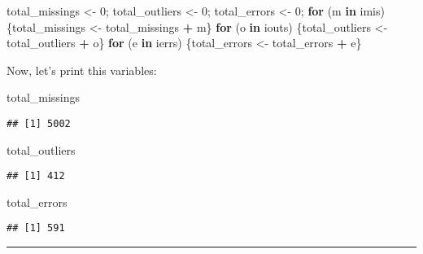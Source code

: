 \documentclass[
  18pt,
  a4paper]{article}
\newenvironment{Shaded}{\begin{snugshade}}{\end{snugshade}}
\newcommand{\ControlFlowTok}[1]{\textcolor[rgb]{0.13,0.29,0.53}{\textbf{#1}}}
\newcommand{\DecValTok}[1]{\textcolor[rgb]{0.00,0.00,0.81}{#1}}
\newcommand{\NormalTok}[1]{#1}
\newcommand{\OperatorTok}[1]{\textcolor[rgb]{0.81,0.36,0.00}{\textbf{#1}}}
\newcommand{\StringTok}[1]{\textcolor[rgb]{0.31,0.60,0.02}{#1}}
\begin{document}
\begin{Shaded}
\begin{Highlighting}[]
\NormalTok{total_missings <-}\StringTok{ }\DecValTok{0}\NormalTok{; total_outliers <-}\StringTok{ }\DecValTok{0}\NormalTok{; total_errors <-}\StringTok{ }\DecValTok{0}\NormalTok{;}
\ControlFlowTok{for}\NormalTok{ (m }\ControlFlowTok{in}\NormalTok{ imis) \{total_missings <-}\StringTok{ }\NormalTok{total_missings }\OperatorTok{+}\StringTok{ }\NormalTok{m\} }
\ControlFlowTok{for}\NormalTok{ (o }\ControlFlowTok{in}\NormalTok{ iouts) \{total_outliers <-}\StringTok{ }\NormalTok{total_outliers }\OperatorTok{+}\StringTok{ }\NormalTok{o\}}
\ControlFlowTok{for}\NormalTok{ (e }\ControlFlowTok{in}\NormalTok{ ierrs) \{total_errors <-}\StringTok{ }\NormalTok{total_errors }\OperatorTok{+}\StringTok{ }\NormalTok{e\}}
\end{Highlighting}
\end{Shaded}

Now, let's print this variables:

\begin{Shaded}
\begin{Highlighting}[]
\NormalTok{total_missings}
\end{Highlighting}
\end{Shaded}

\begin{verbatim}
## [1] 5002
\end{verbatim}

\begin{Shaded}
\begin{Highlighting}[]
\NormalTok{total_outliers}
\end{Highlighting}
\end{Shaded}

\begin{verbatim}
## [1] 412
\end{verbatim}

\begin{Shaded}
\begin{Highlighting}[]
\NormalTok{total_errors}
\end{Highlighting}
\end{Shaded}

\begin{verbatim}
## [1] 591
\end{verbatim}

\begin{center}\rule{0.5\linewidth}{0.5pt}\end{center}
\end{document}
